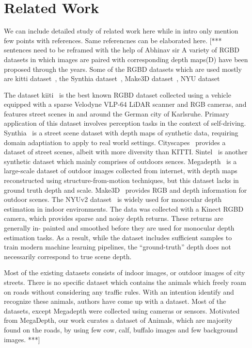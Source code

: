 \documentclass{article}
\begin{document}
\section {Related Work}
We can include detailed study of related work here while in intro only mention few points with references. Same referencnes can be elaborated here. 
[*** sentences need to be reframed with the help of Abhinav sir
A variety of RGBD datasets in which images are paired with corresponding depth maps(D) have been proposed through the years.
Some of the RGBD datasets which are used mostly are kitti dataset~\cite{geiger2013vision}, the Synthia dataset~\cite{ros2016synthia}, 
Make3D dataset~\cite{saxena2008make3d}, NYU dataset~\cite{silberman2012indoor}

The dataset kiiti~\cite{geiger2013vision} is the best known RGBD dataset collected using a vehicle equipped with a sparse Velodyne VLP-64 LiDAR 
scanner and RGB cameras, and features street scenes in and around the German city of Karlsruhe. 
Primary application of this dataset involves perception tasks in the context of self-driving. 
Synthia~\cite{ros2016synthia} is a street scene dataset with depth maps of synthetic data, requiring domain adaptiation to apply to 
real world settings. Cityscapes~\cite{cordts2016cityscapes} provides a dataset of street scenes, albeit with more diversity than KITTI. 
Sintel~\cite{mayer2016large} is another synthetic dataset which mainly comprises of outdoors sences. 
Megadepth~\cite{li2018megadepth} is a large-scale dataset of outdoor images collected from internet, with depth maps reconstructed 
using structure-from-motion techniques, but this dataset lacks in ground truth depth and scale.
Make3D~\cite{saxena2008make3d} provides RGB and depth information for outdoor scenes. 
The NYUv2 dataset~\cite{silberman2012indoor} is widely used for monocular depth estimation in indoor environments. 
The data was collected with a Kinect RGBD camera, which provides sparse and noisy depth returns. 
These returns are generally in- painted and smoothed before they are used for monocular depth estimation tasks. 
As a result, while the dataset includes sufficient samples to train modern machine learning pipelines,
the “ground-truth” depth does not necessarily correspond to true scene depth.

Most of the existing datasets consists of indoor images, or outdoor images of city streets. 
There is no specific dataset which contains the animals which freely roam on roads without considering any traffic rules.
With an intention identify and recognize these animals, authors have come up with a dataset. 
Most of the datasets, except Megadepth were collected using cameras or sensors. 
Motivated from MegaDepth, our work curates a dataset of Animals, which are majority found on the roads, by using few cow, 
calf, buffalo images and few background images.
***]
\end{document}
